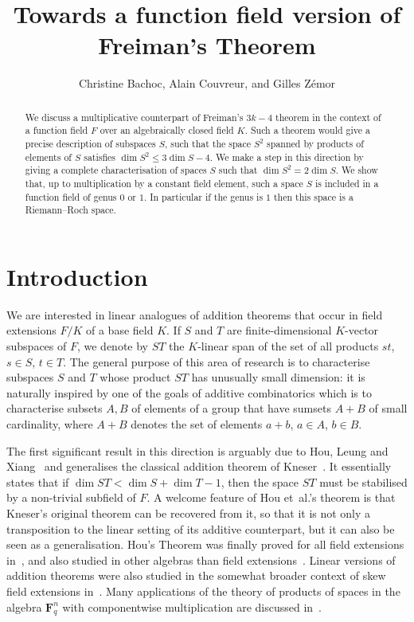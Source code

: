 \documentclass[10pt]{amsart}
\title{Towards a function field version of Freiman's Theorem}
\author{Christine Bachoc, Alain Couvreur, and Gilles Zémor}
\theoremstyle{definition}
\theoremstyle{remark}
\newcommand{\F}{\mathbf{F}}
\renewcommand{\leq}{\leqslant}
\begin{document}
\maketitle
\begin{abstract}
We discuss a multiplicative counterpart of Freiman's $3k-4$ theorem in the context of a function field $F$ over an algebraically closed field $K$. Such a theorem would give a precise description of subspaces $S$, such that the space $S^2$ spanned by products of elements of $S$ satisfies $\dim S^2\leq3 \dim S-4$. We make a step in this direction by giving a complete characterisation of spaces $S$ such that $\dim S^2=2 \dim S$. We show that, up to multiplication by a constant field element, such a space $S$ is included in a function field of genus $0$ or $1$. In particular if the genus is $1$ then this space is a Riemann--Roch space.
\end{abstract}

\section{Introduction}

We are interested in linear analogues of addition theorems that occur in field extensions $F/K$ of a base field $K$. If $S$ and $T$ are finite-dimensional $K$-vector subspaces of $F$, we denote by $ST$ the $K$-linear span of the set of all products $st$, $s\in S$, $t\in T$. The general purpose of this area of research is to characterise subspaces $S$ and $T$ whose product $ST$ has unusually small dimension: it is naturally inspired by one of the goals of additive combinatorics which is to characterise subsets $A,B$ of elements of a group that have sumsets $A+B$ of small cardinality, where $A+B$ denotes the set of elements $a+b$, $a\in A$, $b\in B$.

The first significant result in this direction is arguably due to Hou, Leung and Xiang~\cite{hlx02} and generalises the classical addition theorem of Kneser~\cite{kneser}. It essentially states that if $\dim ST < \dim S + \dim T -1$, then the space $ST$ must be stabilised by a non-trivial subfield of $F$. A welcome feature of Hou et~al.'s theorem is that Kneser's original theorem can be recovered from it, so that it is not only a transposition to the linear setting of its additive counterpart, but it can also be seen as a generalisation. Hou's Theorem was finally proved for all field extensions in~\cite{bszKneser}, and also studied in other algebras than field extensions~\cite{bl15,mz15}. Linear versions of addition theorems were also studied in the somewhat broader context of skew field extensions in~\cite{el09}. Many applications of the theory of products of spaces in the algebra $\F_q^n$ with componentwise multiplication are discussed in~\cite{hugues}.
\end{document}
